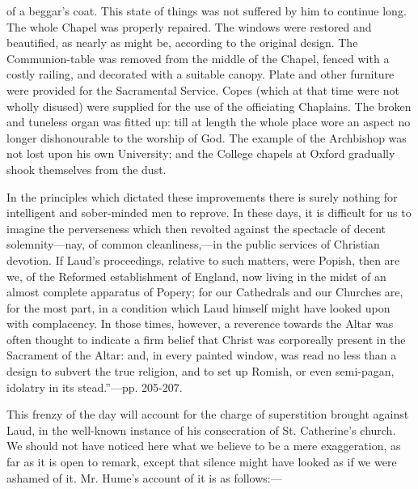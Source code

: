 of a beggar's coat. This state of things was not suffered by him to
continue long. The whole Chapel was properly repaired. The windows were
restored and beautified, as nearly as might be, according to the
original design. The Communion-table was removed from the middle of the
Chapel, fenced with a costly railing, and decorated with a suitable
canopy. Plate and other furniture were provided for the Sacramental
Service. Copes (which at that time were not wholly disused) were
supplied for the use of the officiating Chaplains. The broken and
tuneless organ was fitted up: till at length the whole place wore an
aspect no longer dishonourable to the worship of God. The example of the
Archbishop was not lost upon his own University; and the College chapels
at Oxford gradually shook themselves from the dust.

In the principles which dictated
these improvements there is surely nothing for intelligent and
sober-minded men to reprove. In these days, it is difficult for us to
imagine the perverseness which then revolted against the spectacle of
decent solemnity—nay, of common cleanliness,—in the public services
of Christian devotion. If Laud's proceedings, relative to such matters,
were Popish, then are we, of the Reformed establishment of England, now
living in the midst of an almost complete apparatus of Popery; for our
Cathedrals and our Churches are, for the most part, in a condition which
Laud himself might have looked upon with complacency. In those times,
however, a reverence towards the Altar was often thought to indicate a
firm belief that Christ was corporeally present in the Sacrament of the
Altar: and, in every painted window, was read no less than a design to
subvert the true religion, and to set up Romish, or even semi-pagan,
idolatry in its stead.''—pp. 205-207.

This frenzy of the day will account for the charge
of superstition brought against Laud, in the well-known instance of his
consecration of St. Catherine's church. We should not have noticed
here what we believe to be a mere exaggeration, as far as it is open to
remark, except that silence might have looked as if we were ashamed of
it. Mr. Hume's account of it is as follows:—


